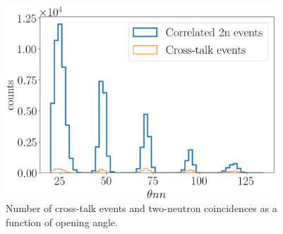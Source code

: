 \begin{figure}
    \centering
    \includegraphics[width = 0.9\textwidth]{Content/Errors/CrosstalkVScoincidence.png}
    \caption{Number of cross-talk events and two-neutron coincidences as a function of opening angle.}
    \label{fig:CrosstalkVScoincidence}
\end{figure}

